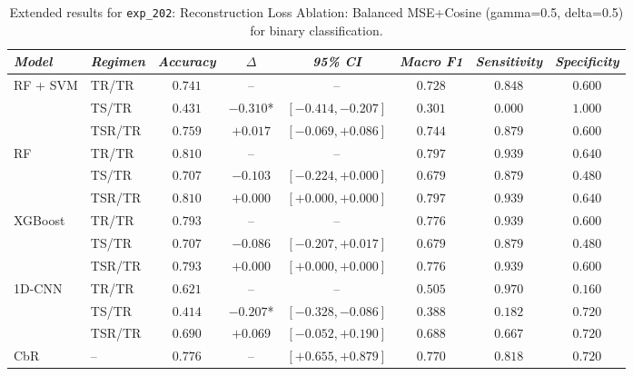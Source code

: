 \begin{table}[H]
\centering
\scriptsize
\caption{Extended results for \texttt{exp\_202}: Reconstruction Loss Ablation: Balanced MSE+Cosine (gamma=0.5, delta=0.5) for binary classification.}
\label{tab:appendix_exp_202}
\begin{tabular*}{\textwidth}{@{\extracolsep{\fill}}llcccccc}
\toprule
\emph{Model} & \emph{Regimen} & \emph{Accuracy} & \emph{$\Delta$} & \emph{95\% CI} & \emph{Macro F1} & \emph{Sensitivity} & \emph{Specificity}\\
\midrule
\multirow{3}{*}{RF + SVM} & TR/TR & $0.741$ & -- & -- & $0.728$ & $0.848$ & $0.600$\\
 & TS/TR & $0.431$ & $-0.310$* & $[-0.414, -0.207]$ & $0.301$ & $0.000$ & $1.000$\\
 & TSR/TR & $0.759$ & $+0.017$ & $[-0.069, +0.086]$ & $0.744$ & $0.879$ & $0.600$\\
\midrule
\multirow{3}{*}{RF} & TR/TR & $0.810$ & -- & -- & $0.797$ & $0.939$ & $0.640$\\
 & TS/TR & $0.707$ & $-0.103$ & $[-0.224, +0.000]$ & $0.679$ & $0.879$ & $0.480$\\
 & TSR/TR & $0.810$ & $+0.000$ & $[+0.000, +0.000]$ & $0.797$ & $0.939$ & $0.640$\\
\midrule
\multirow{3}{*}{XGBoost} & TR/TR & $0.793$ & -- & -- & $0.776$ & $0.939$ & $0.600$\\
 & TS/TR & $0.707$ & $-0.086$ & $[-0.207, +0.017]$ & $0.679$ & $0.879$ & $0.480$\\
 & TSR/TR & $0.793$ & $+0.000$ & $[+0.000, +0.000]$ & $0.776$ & $0.939$ & $0.600$\\
\midrule
\multirow{3}{*}{1D-CNN} & TR/TR & $0.621$ & -- & -- & $0.505$ & $0.970$ & $0.160$\\
 & TS/TR & $0.414$ & $-0.207$* & $[-0.328, -0.086]$ & $0.388$ & $0.182$ & $0.720$\\
 & TSR/TR & $0.690$ & $+0.069$ & $[-0.052, +0.190]$ & $0.688$ & $0.667$ & $0.720$\\
\midrule
CbR & -- & $0.776$ & -- & $[+0.655, +0.879]$ & $0.770$ & $0.818$ & $0.720$\\
\bottomrule
\end{tabular*}
\end{table}

